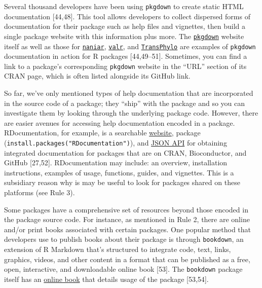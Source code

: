 \documentclass[10pt,letterpaper]{article}
\begin{document}
Several thousand developers have been using \texttt{pkgdown} to create
static HTML documentation {[}44,48{]}. This tool allows developers to
collect dispersed forms of documentation for their package such as help
files and vignettes, then build a single package website with this
information plus more. The
\href{https://pkgdown.r-lib.org/}{\texttt{pkgdown}} website itself as
well as those for
\href{http://naniar.njtierney.com/index.html}{\texttt{naniar}},
\href{https://rnabioco.github.io/valr/}{\texttt{valr}}, and
\href{https://xavierdidelot.github.io/TransPhylo/articles/TransPhylo.html}{\texttt{TransPhylo}}
are examples of \texttt{pkgdown} documentation in action for R packages
{[}44,49--51{]}. Sometimes, you can find a link to a package's
corresponding \texttt{pkgdown} website in the ``URL'' section of its
CRAN page, which is often listed alongside its GitHub link.

So far, we've only mentioned types of help documentation that are
incorporated in the source code of a package; they ``ship'' with the
package and so you can investigate them by looking through the
underlying package code. However, there are easier avenues for accessing
help documentation encoded in a package. RDocumentation, for example, is
a searchable \href{https://www.rdocumentation.org/}{website}, package
(\texttt{install.packages("RDocumentation")}), and
\href{https://www.rdocumentation.org/docs/}{JSON API} for obtaining
integrated documentation for packages that are on CRAN, Bioconductor,
and GitHub {[}27,52{]}. RDocumentation may include: an overview,
installation instructions, examples of usage, functions, guides, and
vignettes. This is a subsidiary reason why is may be useful to look for
packages shared on these platforms (see Rule 3).

Some packages have a comprehensive set of resources beyond those encoded
in the package source code. For instance, as mentioned in Rule 2, there
are online and/or print books associated with certain packages. One
popular method that developers use to publish books about their package
is through \texttt{bookdown}, an extension of R Markdown that's
structured to integrate code, text, links, graphics, videos, and other
content in a format that can be published as a free, open, interactive,
and downloadable online book {[}53{]}. The \texttt{bookdown} package
itself has an \href{https://bookdown.org/yihui/bookdown/}{online book}
that details usage of the package {[}53,54{]}.
\end{document}
